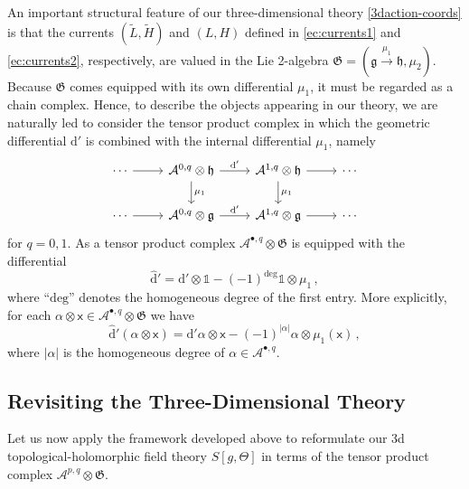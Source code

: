\documentclass[11pt]{amsart}
\newcommand{\tL}{{\tilde L}}
\newcommand{\tH}{{\tilde H}}
\newcommand{\dr}{{\mathrm{d}}}
\newcommand{\fg}{\mathfrak{g}}
\newcommand{\fh}{\mathfrak{h}}
\newcommand{\fG}{\mathfrak{G}}
\numberwithin{equation}{section}
\numberwithin{figure}{section}
\numberwithin{table}{section}
\renewcommand{\d}{\mathrm{d}}
\newcommand{\cA}{\mathcal{A}}
\theoremstyle{thm}
\numberwithin{equation}{subsection}
\theoremstyle{definition}
\theoremstyle{rem}
\begin{document}
An important structural feature of our three-dimensional theory \eqref{3daction-coords} is that the currents $(\tL,\tH)$ and $(L,H)$  defined in \eqref{ec:currents1} and \eqref{ec:currents2}, respectively, are valued in the Lie 2-algebra \(\mathfrak G=(\mathfrak g\xrightarrow{\mu_1}\mathfrak h,\mu_2)\). Because \(\mathfrak G\) comes equipped with its own differential \(\mu_1\), it must be regarded as a chain complex. Hence, to describe the objects appearing in our theory, we are naturally led to consider the tensor product complex in which the geometric differential \(\d'\) is combined with the internal differential \(\mu_1\), namely
\begin{equation}
    \begin{tikzcd}
  \cdots \arrow[r] & \cA^{0,q} \otimes \fh \arrow[r, "\dr'"] \arrow[d, "\mu_1"] & \cA^{1,q} \otimes \fh \arrow[r] \arrow[d, "\mu_1"] &\cdots \\
  \cdots \arrow[r] & \cA^{0,q} \otimes \fg\arrow[r, "\dr'"] & \cA^{1,q} \otimes \fg  \arrow[r] & \cdots
\end{tikzcd}
\end{equation}
for $q=0,1$. As a tensor product complex $\cA^{\bullet,q}\otimes \fG$ is equipped with the differential
\begin{equation}
    \hat \dr' = \dr'\otimes \mathbb{1} - (-1)^{\text{deg}} \mathbb{1}\otimes \mu_1\,,
\end{equation}
where ``$\text{deg}$'' denotes the homogeneous degree of the first entry. More explicitly, for each $\alpha\otimes\mathsf{x}\in \cA^{\bullet,q}\otimes \fG$ we have 
\begin{equation}
    \hat \dr'(\alpha\otimes \mathsf{x}) = \dr'\alpha\otimes \mathsf{x} - (-1)^{|\alpha|} \alpha\otimes \mu_1(\mathsf{x}) \,,
\end{equation}
where $|\alpha|$ is the homogeneous degree of $\alpha\in\cA^{\bullet,q}$.




\subsection{Revisiting the Three-Dimensional Theory}

Let us now apply the framework developed above to reformulate our 3d topological-holomorphic field theory \(S[g,\Theta] \) in terms of the tensor product complex \( \mathcal{A}^{p,q} \otimes \fG \).  
\end{document}
